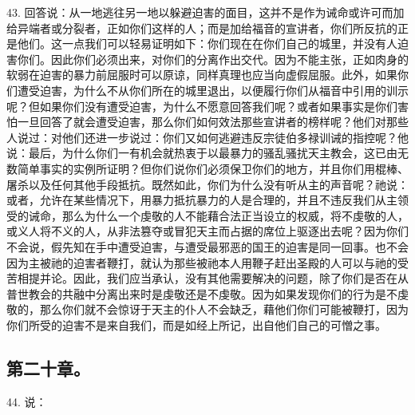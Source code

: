43. 回答说：从一地逃往另一地以躲避迫害的面目，这并不是作为诫命或许可而加给异端者或分裂者，正如你们这样的人；而是加给福音的宣讲者，你们所反抗的正是他们。这一点我们可以轻易证明如下：你们现在在你们自己的城里，并没有人迫害你们。因此你们必须出来，对你们的分离作出交代。因为不能主张，正如肉身的软弱在迫害的暴力前屈服时可以原谅，同样真理也应当向虚假屈服。此外，如果你们遭受迫害，为什么不从你们所在的城里退出，以便履行你们从福音中引用的训示呢？但如果你们没有遭受迫害，为什么不愿意回答我们呢？或者如果事实是你们害怕一旦回答了就会遭受迫害，那么你们如何效法那些宣讲者的榜样呢？他们对那些人说过：对他们还进一步说过：你们又如何逃避违反宗徒伯多禄训诫的指控呢？他说：最后，为什么你们一有机会就热衷于以最暴力的骚乱骚扰天主教会，这已由无数简单事实的实例所证明？但你们说你们必须保卫你们的地方，并且你们用棍棒、屠杀以及任何其他手段抵抗。既然如此，你们为什么没有听从主的声音呢？祂说：或者，允许在某些情况下，用暴力抵抗暴力的人是合理的，并且不违反我们从主领受的诫命，那么为什么一个虔敬的人不能藉合法正当设立的权威，将不虔敬的人，或义人将不义的人，从非法篡夺或冒犯天主而占据的席位上驱逐出去呢？因为你们不会说，假先知在手中遭受迫害，与遭受最邪恶的国王的迫害是同一回事。也不会因为主被祂的迫害者鞭打，就认为那些被祂本人用鞭子赶出圣殿的人可以与祂的受苦相提并论。因此，我们应当承认，没有其他需要解决的问题，除了你们是否在从普世教会的共融中分离出来时是虔敬还是不虔敬。因为如果发现你们的行为是不虔敬的，那么你们就不会惊讶于天主的仆人不会缺乏，藉他们你们可能被鞭打，因为你们所受的迫害不是来自我们，而是如经上所记，出自他们自己的可憎之事。\par


\subsection{第二十章。}

44. 说：\par

